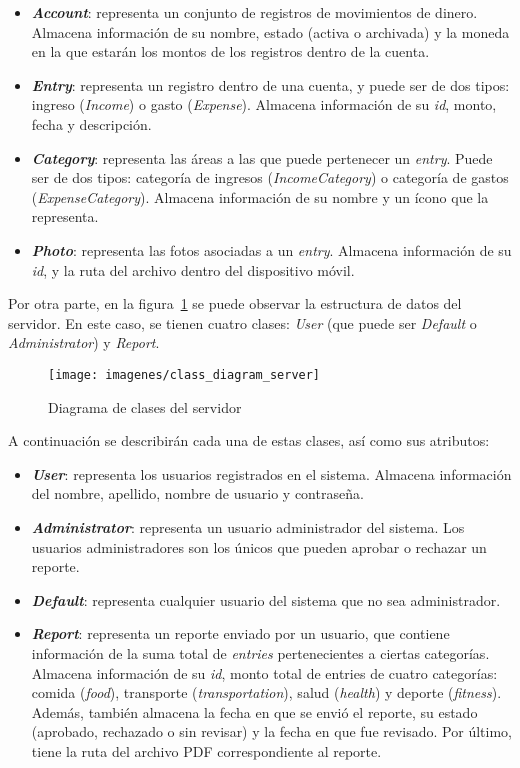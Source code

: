 \begin{itemize}
	\item \textbf{\textit{Account}}: representa un conjunto de registros de movimientos de dinero. Almacena información de su nombre, estado (activa o archivada) y la moneda en la que estarán los montos de los registros dentro de la cuenta.
	\item \textbf{\textit{Entry}}: representa un registro dentro de una cuenta, y puede ser de dos tipos: ingreso (\textit{Income}) o gasto (\textit{Expense}). Almacena información de su \textit{id}, monto, fecha y descripción.
	\item \textbf{\textit{Category}}: representa las áreas a las que puede pertenecer un \textit{entry}. Puede ser de dos tipos: categoría de ingresos (\textit{IncomeCategory}) o categoría de gastos (\textit{ExpenseCategory}). Almacena información de su nombre y un ícono que la representa.
	\item \textbf{\textit{Photo}}: representa las fotos asociadas a un \textit{entry}. Almacena información de su \textit{id}, y la ruta del archivo dentro del dispositivo móvil.
\end{itemize}

Por otra parte, en la figura~\ref{fig:diagramaClasesServidor} se puede observar la estructura de datos del servidor. En este caso, se tienen cuatro clases: \textit{User} (que puede ser \textit{Default} o \textit{Administrator}) y \textit{Report}.

\begin{figure}[ht]
  \centering
  \texttt{[image: imagenes/class\_diagram\_server]}
  \caption{Diagrama de clases del servidor}
  \label{fig:diagramaClasesServidor}
\end{figure}

A continuación se describirán cada una de estas clases, así como sus atributos:

\begin{itemize}
	\item \textbf{\textit{User}}: representa los usuarios registrados en el sistema. Almacena información del nombre, apellido, nombre de usuario y contraseña. 
	\item \textbf{\textit{Administrator}}: representa un usuario administrador del sistema. Los usuarios administradores son los únicos que pueden aprobar o rechazar un reporte.
	\item \textbf{\textit{Default}}: representa cualquier usuario del sistema que no sea administrador.
	\item \textbf{\textit{Report}}: representa un reporte enviado por un usuario, que contiene información de la suma total de \textit{entries} pertenecientes a ciertas categorías. Almacena información de su \textit{id}, monto total de entries de cuatro categorías: comida (\textit{food}), transporte (\textit{transportation}), salud (\textit{health}) y deporte (\textit{fitness}). Además, también almacena la fecha en que se envió el reporte, su estado (aprobado, rechazado o sin revisar) y la fecha en que fue revisado. Por último, tiene la ruta del archivo PDF correspondiente al reporte.
\end{itemize} 

